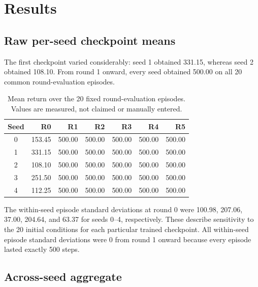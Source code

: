 \documentclass[11pt]{article}
\begin{document}
\section{Results}

\subsection{Raw per-seed checkpoint means}

The first checkpoint varied considerably: seed 1 obtained 331.15, whereas seed 2 obtained 108.10. From round 1 onward, every seed obtained 500.00 on all 20 common round-evaluation episodes.

\begin{table}[ht]
\centering
\caption{Mean return over the 20 fixed round-evaluation episodes. Values are measured, not claimed or manually entered.}
\small
\begin{tabular}{@{}crrrrrr@{}}
\toprule
Seed & R0 & R1 & R2 & R3 & R4 & R5 \\
\midrule
0 & 153.45 & 500.00 & 500.00 & 500.00 & 500.00 & 500.00 \\
1 & 331.15 & 500.00 & 500.00 & 500.00 & 500.00 & 500.00 \\
2 & 108.10 & 500.00 & 500.00 & 500.00 & 500.00 & 500.00 \\
3 & 251.50 & 500.00 & 500.00 & 500.00 & 500.00 & 500.00 \\
4 & 112.25 & 500.00 & 500.00 & 500.00 & 500.00 & 500.00 \\
\bottomrule
\end{tabular}
\end{table}

The within-seed episode standard deviations at round 0 were 100.98, 207.06, 37.00, 204.64, and 63.37 for seeds 0--4, respectively. These describe sensitivity to the 20 initial conditions for each particular trained checkpoint. All within-seed episode standard deviations were 0 from round 1 onward because every episode lasted exactly 500 steps.

\subsection{Across-seed aggregate}
\end{document}
